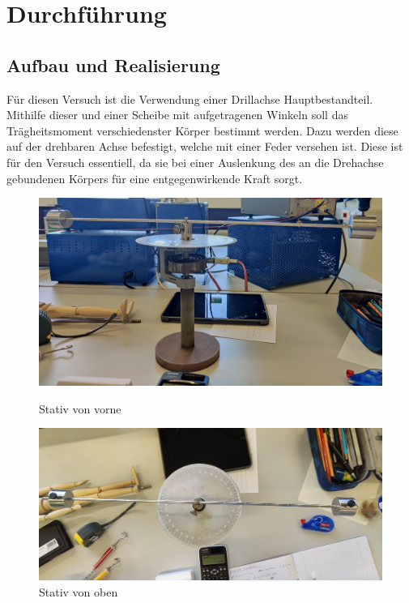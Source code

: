 \section{Durchführung}
\label{sec:Durchführung}

\subsection{Aufbau und Realisierung}
\label{sec:Aufbau und Realisierung}
Für diesen Versuch ist die Verwendung einer Drillachse Hauptbestandteil.
Mithilfe dieser und einer Scheibe mit aufgetragenen Winkeln soll das
Trägheitsmoment verschiedenster Körper bestimmt werden. Dazu werden diese
auf der drehbaren Achse befestigt, welche mit einer Feder versehen ist.
Diese ist für den Versuch essentiell, da sie bei einer Auslenkung des
an die Drehachse gebundenen Körpers für eine entgegenwirkende Kraft sorgt.
\begin{figure}[h]
    \centering
    \begin{minipage}{0.45\textwidth}
        \centering
        \includegraphics[width=\textwidth]{Bilder/abb1.jpg}
        \caption{Stativ von vorne}
    \end{minipage}
    \hfill
    \begin{minipage}{0.45\textwidth}
        \centering
        \includegraphics[width=\textwidth]{Bilder/abb2.jpg}
        \caption{Stativ von oben}
    \end{minipage}
\end{figure}
